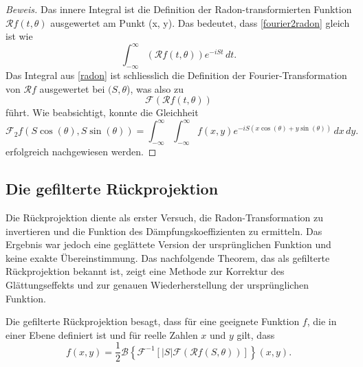 \begin{proof}[Beweis]
	Das innere Integral ist die Definition der Radon-transformierten Funktion $\mathscr{R}f(t, \theta)$ ausgewertet am Punkt (x, y). Das bedeutet, dass \eqref{fourier2radon} gleich ist wie
	\begin{equation}\label{radon}
		\int_{-\infty}^{\infty} (\mathscr{R}f(t, \theta)) e^{-iSt}\,dt.
	\end{equation}
	Das Integral aus \eqref{radon} ist schliesslich die Definition der Fourier-Transformation von $\mathscr{R}f$ ausgewertet bei $(S, \theta$), was also zu
	\begin{equation}\label{fourier1radon}
		\mathscr{F}(\mathscr{R}f(t, \theta))
	\end{equation}
	führt. Wie beabsichtigt, konnte die Gleichheit 
	\begin{equation}
		\mathscr{F}_2f(S\cos(\theta), S\sin(\theta)) = \int_{-\infty}^{\infty}\int_{-\infty}^{\infty} f(x, y)e^{-iS(x\cos(\theta)+y\sin(\theta))}\,dx\,dy.
	\end{equation}
	erfolgreich nachgewiesen werden.
\end{proof}



\subsection{Die gefilterte Rückprojektion
	\label{ct:subsection:gefilterterueck}}
Die Rückprojektion diente als erster Versuch, die Radon-Transformation zu invertieren und die Funktion des Dämpfungskoeffizienten zu ermitteln. Das Ergebnis war jedoch eine geglättete Version der ursprünglichen Funktion und keine exakte Übereinstimmung. Das nachfolgende Theorem, das als gefilterte Rückprojektion bekannt ist, zeigt eine Methode zur Korrektur des Glättungseffekts und zur genauen Wiederherstellung der ursprünglichen Funktion.

Die gefilterte Rückprojektion besagt, dass für eine geeignete Funktion $f$, die in einer Ebene definiert ist und für reelle Zahlen $x$ und $y$ gilt, dass
\begin{equation}
	f(x, y) = \dfrac{1}{2}\mathscr{B}\left\{\mathscr{F}^{-1}[|S|\mathscr{F}(\mathscr{R}f(S, \theta))]\right\}(x,y).
\end{equation}

